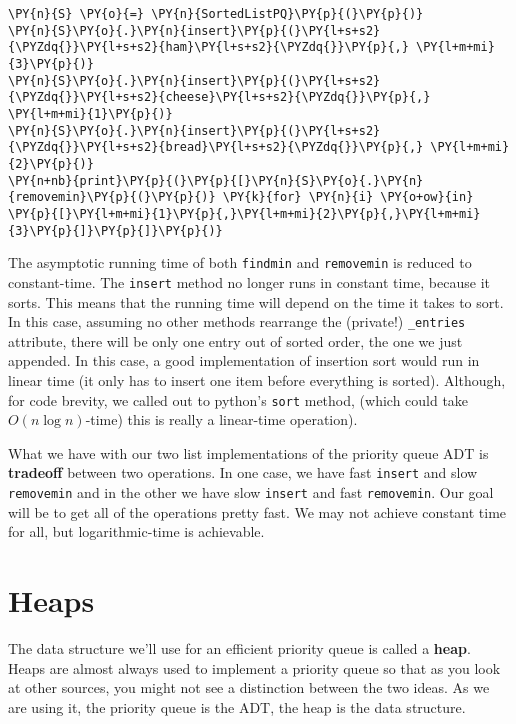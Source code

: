 \begin{Verbatim}[commandchars=\\\{\}]
\PY{n}{S} \PY{o}{=} \PY{n}{SortedListPQ}\PY{p}{(}\PY{p}{)}
\PY{n}{S}\PY{o}{.}\PY{n}{insert}\PY{p}{(}\PY{l+s+s2}{\PYZdq{}}\PY{l+s+s2}{ham}\PY{l+s+s2}{\PYZdq{}}\PY{p}{,} \PY{l+m+mi}{3}\PY{p}{)}
\PY{n}{S}\PY{o}{.}\PY{n}{insert}\PY{p}{(}\PY{l+s+s2}{\PYZdq{}}\PY{l+s+s2}{cheese}\PY{l+s+s2}{\PYZdq{}}\PY{p}{,} \PY{l+m+mi}{1}\PY{p}{)}
\PY{n}{S}\PY{o}{.}\PY{n}{insert}\PY{p}{(}\PY{l+s+s2}{\PYZdq{}}\PY{l+s+s2}{bread}\PY{l+s+s2}{\PYZdq{}}\PY{p}{,} \PY{l+m+mi}{2}\PY{p}{)}
\PY{n+nb}{print}\PY{p}{(}\PY{p}{[}\PY{n}{S}\PY{o}{.}\PY{n}{removemin}\PY{p}{(}\PY{p}{)} \PY{k}{for} \PY{n}{i} \PY{o+ow}{in} \PY{p}{[}\PY{l+m+mi}{1}\PY{p}{,}\PY{l+m+mi}{2}\PY{p}{,}\PY{l+m+mi}{3}\PY{p}{]}\PY{p}{]}\PY{p}{)}
\end{Verbatim}



The asymptotic running time of both \texttt{findmin} and \texttt{removemin} is reduced to constant-time.  The \texttt{insert} method no longer runs in constant time, because it sorts.  This means that the running time will depend on the time it takes to sort.  In this case, assuming no other methods rearrange the (private!) \texttt{\_entries} attribute, there will be only one entry out of sorted order, the one we just appended.  In this case, a good implementation of insertion sort would run in linear time (it only has to insert one item before everything is sorted).  Although, for code brevity, we called out to python's \texttt{sort} method, (which could take $O(n \log n)$-time) this is really a linear-time operation).


What we have with our two list implementations of the priority queue ADT is \textbf{tradeoff} between two operations.  In one case, we have fast \texttt{insert} and slow \texttt{removemin} and in the other we have slow \texttt{insert} and fast \texttt{removemin}.  Our goal will be to get all of the operations pretty fast.  We may not achieve constant time for all, but logarithmic-time is achievable.

\section{Heaps}


The data structure we'll use for an efficient priority queue is called a \textbf{heap}.  Heaps are almost always used to implement a priority queue so that as you look at other sources, you might not see a distinction between the two ideas.  As we are using it, the priority queue is the ADT, the heap is the data structure.  


